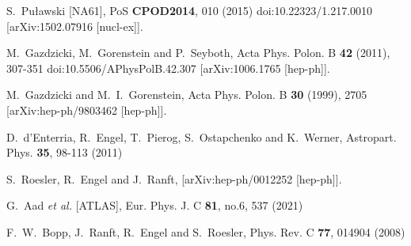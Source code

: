 \begin{thebibliography}{99}
S.~Pu\l{}awski [NA61],
PoS \textbf{CPOD2014}, 010 (2015)
doi:10.22323/1.217.0010
[arXiv:1502.07916 [nucl-ex]].

M.~Gazdzicki, M.~Gorenstein and P.~Seyboth,
Acta Phys. Polon. B \textbf{42} (2011), 307-351
doi:10.5506/APhysPolB.42.307
[arXiv:1006.1765 [hep-ph]].

M.~Gazdzicki and M.~I.~Gorenstein,
Acta Phys. Polon. B \textbf{30} (1999), 2705
[arXiv:hep-ph/9803462 [hep-ph]].




D.~d'Enterria, R.~Engel, T.~Pierog, S.~Ostapchenko and K.~Werner,
Astropart. Phys. \textbf{35}, 98-113 (2011)

S.~Roesler, R.~Engel and J.~Ranft,
[arXiv:hep-ph/0012252 [hep-ph]].

G.~Aad \textit{et al.} [ATLAS],
Eur. Phys. J. C \textbf{81}, no.6, 537 (2021)

F.~W.~Bopp, J.~Ranft, R.~Engel and S.~Roesler,
Phys. Rev. C \textbf{77}, 014904 (2008)


\end{thebibliography}
